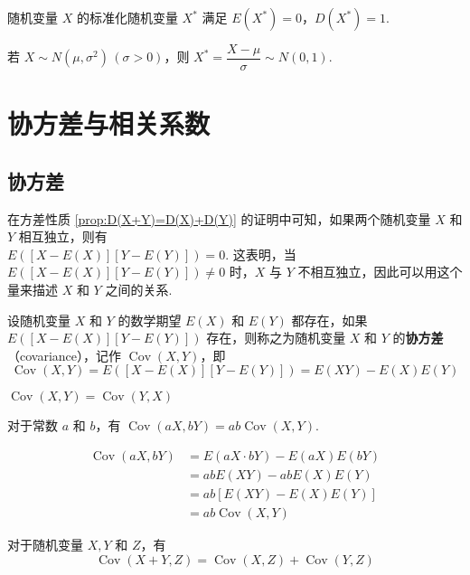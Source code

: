 随机变量 $X$ 的标准化随机变量 $X^*$ 满足 $E(X^*)=0$，$D(X^*)=1$.

若 $X \sim N(\mu,\sigma^2) \, (\sigma > 0)$，则 $X^* = \dfrac{X-\mu}{\sigma} \sim N(0,1)$.

\section{协方差与相关系数}

\subsection{协方差}

在方差性质 \ref*{prop:D(X+Y)=D(X)+D(Y)} 的证明中可知，如果两个随机变量 $X$ 和 $Y$ 相互独立，则有 \\
$E([X-E(X)][Y-E(Y)]) = 0$. 这表明，当 $E([X-E(X)][Y-E(Y)]) \not= 0$ 时，$X$ 与 $Y$ 不相互独立，因此可以用这个量来描述 $X$ 和 $Y$ 之间的关系.

\begin{definition}
    设随机变量 $X$ 和 $Y$ 的数学期望 $E(X)$ 和 $E(Y)$ 都存在，如果 $E([X-E(X)][Y-E(Y)])$ 存在，则称之为随机变量 $X$ 和 $Y$ 的\textbf{协方差}（covariance），记作 $\operatorname{Cov}(X,Y)$，即
    $$
    \operatorname{Cov}(X,Y) = E([X-E(X)][Y-E(Y)]) = E(XY) - E(X) E(Y)
    $$
\end{definition}

\setcounter{propertyname}{0}

\begin{property}
    $\operatorname{Cov}(X,Y) = \operatorname{Cov}(Y,X)$
\end{property}

\begin{property}
    对于常数 $a$ 和 $b$，有 $\operatorname{Cov}(aX,bY) = ab \operatorname{Cov}(X,Y)$.
\end{property}

\begin{myproof}
    $$
    \begin{aligned}
        \operatorname{Cov}(aX,bY) &= E(aX \cdot bY) - E(aX) E(bY) \\
        &= ab E(XY) - ab E(X) E(Y) \\
        &= ab[E(XY) - E(X) E(Y)] \\
        &= ab \operatorname{Cov}(X,Y)
    \end{aligned}
    $$
\end{myproof}

\begin{property}
    对于随机变量 $X,Y$ 和 $Z$，有
    $$
    \operatorname{Cov}(X+Y,Z) = \operatorname{Cov}(X,Z) + \operatorname{Cov}(Y,Z)
    $$
\end{property}

